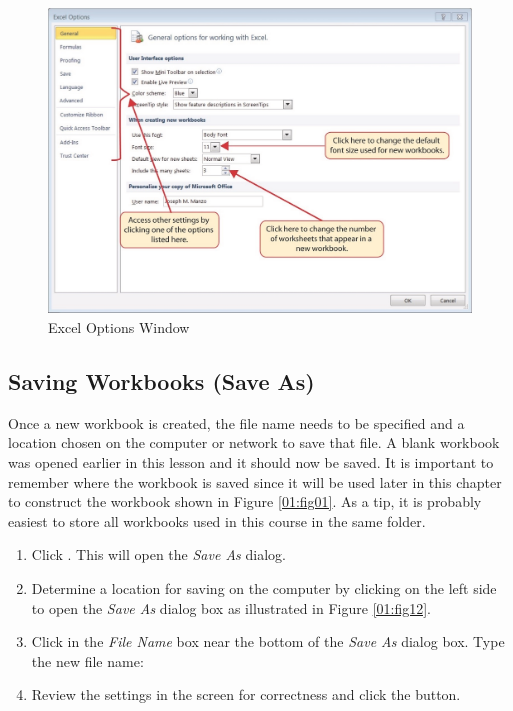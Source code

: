 \begin{figure}[H]
	\centering
	\includegraphics[width=\maxwidth{.95\linewidth}]{gfx/ch01_fig10}
	\caption{Excel Options Window}
	\label{01:fig10}
\end{figure}

\subsection{Saving Workbooks (Save As)}

Once a new workbook is created, the file name needs to be specified and a location chosen on the computer or network to save that file. A blank workbook was opened earlier in this lesson and it should now be saved. It is important to remember where the workbook is saved since it will be used later in this chapter to construct the workbook shown in Figure \ref{01:fig01}. As a tip, it is probably easiest to store all workbooks used in this course in the same folder.

\begin{enumbox}
	\begin{enumerate}
		\item Click . This will open the \textit{Save As} dialog.
		\item Determine a location for saving on the computer by clicking  on the left side to open the \textit{Save As} dialog box as illustrated in Figure \ref{01:fig12}.
		\item Click in the \textit{File Name} box near the bottom of the \textit{Save As} dialog box. Type the new file name: 
		\item Review the settings in the screen for correctness and click the  button.
	\end{enumerate}
\end{enumbox}


